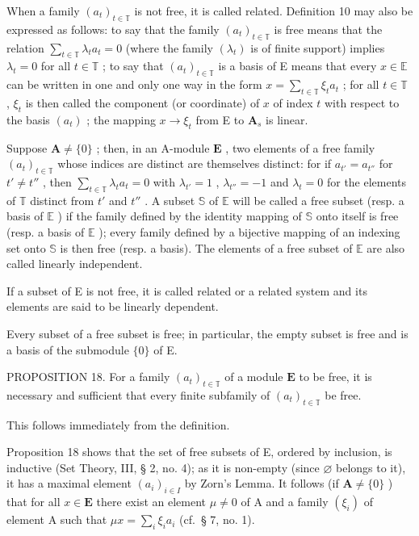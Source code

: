 When a family \((a_{t})_{t\in \mathbb{T}}\) is not free, it is called related. Definition 10 may also be expressed as follows: to say that the family \((a_{t})_{t\in \mathbb{T}}\) is free means that the relation \(\sum_{t\in \mathbb{T}}\lambda_t a_t = 0\) (where the family \((\lambda_t)\) is of finite support) implies \(\lambda_{t} = 0\) for all \(t\in \mathbb{T}\) ; to say that \((a_{t})_{t\in \mathbb{T}}\) is a basis of E means that every \(x\in \mathbb{E}\) can be written in one and only one way in the form \(x = \sum_{t\in \mathbb{T}}\xi_t a_t\) ; for all \(t\in \mathbb{T}\) , \(\xi_{t}\) is then called the component (or coordinate) of \(x\) of index \(t\) with respect to the basis \((a_{t})\) ; the mapping \(x\to \xi_t\) from E to \(\mathbf{A}_s\) is linear.

Suppose \(\mathbf{A} \neq \{0\}\) ; then, in an A-module \(\mathbf{E}\) , two elements of a free family \((a_t)_{t \in \mathbb{T}}\) whose indices are distinct are themselves distinct: for if \(a_{t'} = a_{t''}\) for \(t' \neq t''\) , then \(\sum_{t \in \mathbb{T}} \lambda_t a_t = 0\) with \(\lambda_{t'} = 1\) , \(\lambda_{t''} = -1\) and \(\lambda_t = 0\) for the elements of \(\mathbb{T}\) distinct from \(t'\) and \(t''\) . A subset \(\mathbb{S}\) of \(\mathbb{E}\) will be called a free subset (resp. a basis of \(\mathbb{E}\) ) if the family defined by the identity mapping of \(\mathbb{S}\) onto itself is free (resp. a basis of \(\mathbb{E}\) ); every family defined by a bijective mapping of an indexing set onto \(\mathbb{S}\) is then free (resp. a basis). The elements of a free subset of \(\mathbb{E}\) are also called linearly independent.

If a subset of E is not free, it is called related or a related system and its elements are said to be linearly dependent.

Every subset of a free subset is free; in particular, the empty subset is free and is a basis of the submodule \(\{0\}\) of E.

PROPOSITION 18. For a family \((a_{t})_{t\in \mathbb{T}}\) of a module \(\mathbf{E}\) to be free, it is necessary and sufficient that every finite subfamily of \((a_{t})_{t\in \mathbb{T}}\) be free.

This follows immediately from the definition.

Proposition 18 shows that the set of free subsets of E, ordered by inclusion, is inductive (Set Theory, III, § 2, no. 4); as it is non-empty (since \(\varnothing\) belongs to it), it has a maximal element \((a_{i})_{i\in I}\) by Zorn's Lemma. It follows (if \(\mathbf{A}\neq \{0\}\) ) that for all \(x\in \mathbf{E}\) there exist an element \(\mu \neq 0\) of A and a family \((\xi_{i})\) of element A such that \(\mu x = \sum_{i}\xi_{i}a_{i}\) (cf.~§ 7, no. 1).

